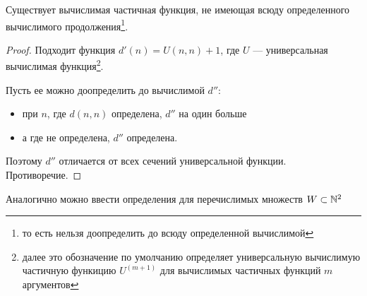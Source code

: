 \begin{thm}
	Существует вычислимая частичная функция, не имеющая всюду определенного вычислимого продолжения\footnote{то есть нельзя доопределить до всюду определенной вычислимой}.
\end{thm}
\begin{proof}
	Подходит функция $ d'(n) = U(n, n) + 1$, где $ U$ --- универсальная вычислимая функция\footnote{далее это обозначение по умолчанию определяет универсальную вычислимую частичную функицию $ U^{(m+1)}$ для вычислимых частичных функций $ m$ аргументов}.

	Пусть ее можно доопределить до вычислимой $ d''$:
	\begin{itemize}
		\item при $ n$, где $ d(n, n) $ определена, $ d''$ на один больше
		\item а где не определена, $ d''$ определена.
	\end{itemize}
	Поэтому $ d''$ отличается от всех сечений универсальной функции. Противоречие. 
\end{proof}


Аналогично можно ввести определения для перечислимых множеств
$ W \subset \mathbb{N}^2$


